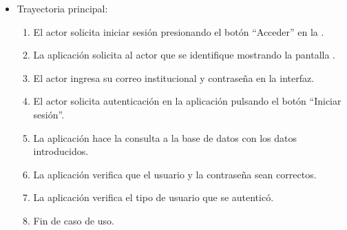 \begin{itemize}	
	\item Trayectoria principal:
		\begin{enumerate}
			\item El actor solicita iniciar sesión presionando el botón “Acceder” en la .
			\item La aplicación solicita al actor que se identifique mostrando la pantalla .
			\item El actor ingresa su correo institucional y contraseña en la interfaz.
			\item El actor solicita autenticación en la aplicación pulsando el botón “Iniciar sesión”. 
			\item La aplicación hace la consulta a la base de datos con los datos introducidos.
			\item La aplicación verifica que el usuario y la contraseña sean correctos.
			\item La aplicación verifica el tipo de usuario que se autenticó.
			\item Fin de caso de uso.


\end{enumerate}
\end{itemize}

